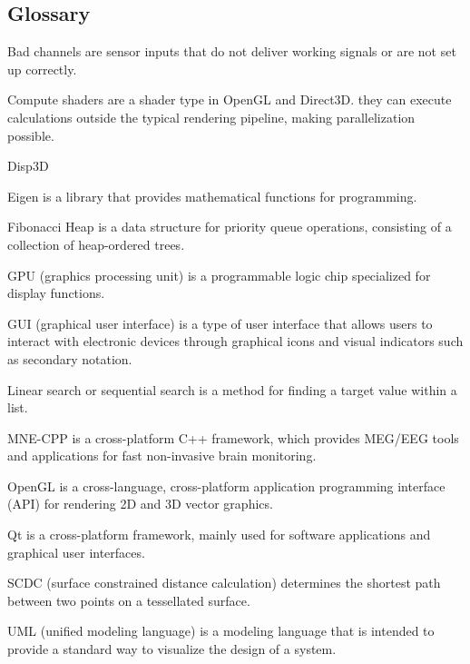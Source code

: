 \subsection {Glossary}
\begin{aims}

\item [Bad channels] are sensor inputs that do not deliver working signals or are not set up correctly.
\item [Compute shaders] are a shader type in OpenGL and Direct3D. they can execute calculations outside the typical rendering pipeline, making parallelization possible.
\item [Disp3D]
\item [Eigen] is a library that provides mathematical functions for programming.
\item [Fibonacci Heap] is a data structure for priority queue operations, consisting of a collection of heap-ordered trees.
\item [GPU] (graphics processing unit) is a programmable logic chip specialized for display functions.
\item [GUI] (graphical user interface) is a type of user interface that allows users to interact with electronic devices through graphical icons and visual indicators such as secondary notation.
\item [Linear search] or sequential search is a method for finding a target value within a list.
\item [MNE-CPP] is a cross-platform C++ framework, which provides MEG/EEG tools and applications for fast non-invasive brain monitoring.
\item [OpenGL] is a cross-language, cross-platform application programming interface (API) for rendering 2D and 3D vector graphics.
\item [Qt] is a cross-platform framework, mainly used for software applications and graphical user interfaces.
\item [SCDC] (surface constrained distance calculation) determines the shortest path between two points on a tessellated surface.
\item [UML] (unified modeling language)  is a modeling language that is intended to provide a standard way to visualize the design of a system.
\end{aims} 
